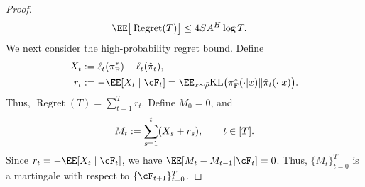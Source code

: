 \documentclass[11pt]{article}
\newcommand{\KL}{\text{KL}}
\newcommand{\pif}{\pi_{\mathrm{F}}}
\begin{document}
\begin{proof}
\begin{align*}
    \EE \big[\operatorname{Regret}(T)\big]
    &\le 4S A^H\log T.
\end{align*}
We next consider the high-probability regret bound. Define
\begin{align*}
    X_t
    &:=
    \ell_t(\pif^*)-\ell_t(\hat\pi_t),\\
    r_t
    &:=
    -\EE[X_t\mid\cF_t]
    =
    \EE_{x\sim\bar\rho}
    \KL\big(
        \pif^*(\cdot|x)
        \|
        \hat\pi_t(\cdot|x)
    \big).
\end{align*}
Thus, $\operatorname{Regret}(T)=\sum_{t=1}^T r_t$.
Define $M_0 = 0$, and
\begin{align}
    M_t
    :=
    \sum_{s=1}^t(X_s+r_s),
    \qquad t\in[T].
\notag
\end{align}
Since $r_t=-\EE[X_t\mid\cF_t]$, we have $\EE[M_t-M_{t-1} | \cF_t]=0$. Thus, $\{M_t\}_{t=0}^T$ is a martingale with respect to $\{\cF_{t+1}\}_{t=0}^T$.


\end{proof}
\end{document}
